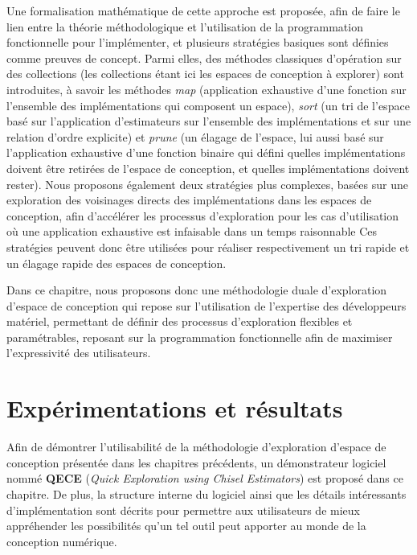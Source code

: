     Une formalisation mathématique de cette approche est proposée, afin de faire le lien entre la théorie méthodologique et l'utilisation de la programmation fonctionnelle pour l'implémenter, et plusieurs stratégies basiques sont définies comme preuves de concept.
    Parmi elles, des méthodes classiques d'opération sur des collections (les collections étant ici les espaces de conception à explorer) sont introduites, à savoir les méthodes {\it map} (application exhaustive d'une fonction sur l'ensemble des implémentations qui composent un espace), {\it sort} (un tri de l'espace basé sur l'application d'estimateurs sur l'ensemble des implémentations et sur une relation d'ordre explicite) et {\it prune} (un élagage de l'espace, lui aussi basé sur l'application exhaustive d'une fonction binaire qui défini quelles implémentations doivent être retirées de l'espace de conception, et quelles implémentations doivent rester).
    Nous proposons également deux stratégies plus complexes, basées sur une exploration des voisinages directs des implémentations dans les espaces de conception, afin d’accélérer les processus d'exploration pour les cas d'utilisation où une application exhaustive est infaisable dans un temps raisonnable
    Ces stratégies peuvent donc être utilisées pour réaliser respectivement un tri rapide et un élagage rapide des espaces de conception.

    Dans ce chapitre, nous proposons donc une méthodologie duale d'exploration d'espace de conception qui repose sur l'utilisation de l'expertise des développeurs matériel, permettant de définir des processus d'exploration flexibles et paramétrables, reposant sur la programmation fonctionnelle afin de maximiser l'expressivité des utilisateurs.

\section{Expérimentations et résultats}
\label{ch.resume:sec.expe}
    Afin de démontrer l'utilisabilité de la méthodologie d'exploration d'espace de conception présentée dans les chapitres précédents, un démonstrateur logiciel nommé {\bf QECE} ({\it Quick Exploration using Chisel Estimators}) est proposé dans ce chapitre.
    De plus, la structure interne du logiciel ainsi que les détails intéressants d'implémentation sont décrits pour permettre aux utilisateurs de mieux appréhender les possibilités qu'un tel outil peut apporter au monde de la conception numérique.

